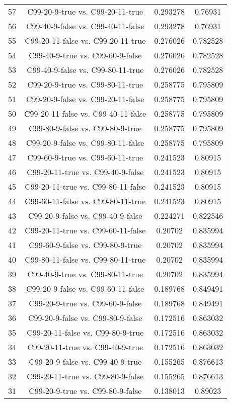 \documentclass[a4paper,10pt]{article}
\begin{document}
\begin{landscape}
\begin{table}[!htp]
\begin{tabular}{cccc}
57&C99-20-9-true vs. C99-20-11-true&0.293278&0.76931\\
56&C99-40-9-false vs. C99-40-11-false&0.293278&0.76931\\
55&C99-20-11-false vs. C99-20-11-true&0.276026&0.782528\\
54&C99-40-9-true vs. C99-60-9-false&0.276026&0.782528\\
53&C99-40-9-false vs. C99-80-11-true&0.276026&0.782528\\
52&C99-20-9-true vs. C99-80-11-true&0.258775&0.795809\\
51&C99-20-9-false vs. C99-20-11-false&0.258775&0.795809\\
50&C99-20-11-false vs. C99-40-11-false&0.258775&0.795809\\
49&C99-80-9-false vs. C99-80-9-true&0.258775&0.795809\\
48&C99-20-9-false vs. C99-80-11-false&0.258775&0.795809\\
47&C99-60-9-true vs. C99-60-11-true&0.241523&0.80915\\
46&C99-20-11-true vs. C99-40-9-false&0.241523&0.80915\\
45&C99-20-11-true vs. C99-80-11-false&0.241523&0.80915\\
44&C99-60-11-false vs. C99-80-11-true&0.241523&0.80915\\
43&C99-20-9-false vs. C99-40-9-false&0.224271&0.822546\\
42&C99-20-11-true vs. C99-60-11-false&0.20702&0.835994\\
41&C99-60-9-false vs. C99-80-9-true&0.20702&0.835994\\
40&C99-80-11-false vs. C99-80-11-true&0.20702&0.835994\\
39&C99-40-9-true vs. C99-80-11-true&0.20702&0.835994\\
38&C99-20-9-false vs. C99-60-11-false&0.189768&0.849491\\
37&C99-20-9-true vs. C99-60-9-false&0.189768&0.849491\\
36&C99-20-9-false vs. C99-80-9-false&0.172516&0.863032\\
35&C99-20-11-false vs. C99-80-9-true&0.172516&0.863032\\
34&C99-20-11-true vs. C99-40-9-true&0.172516&0.863032\\
33&C99-20-9-false vs. C99-40-9-true&0.155265&0.876613\\
32&C99-20-11-true vs. C99-80-9-false&0.155265&0.876613\\
31&C99-20-9-true vs. C99-80-9-false&0.138013&0.89023\\

\end{tabular}
\end{table}
\end{landscape}
\end{document}
